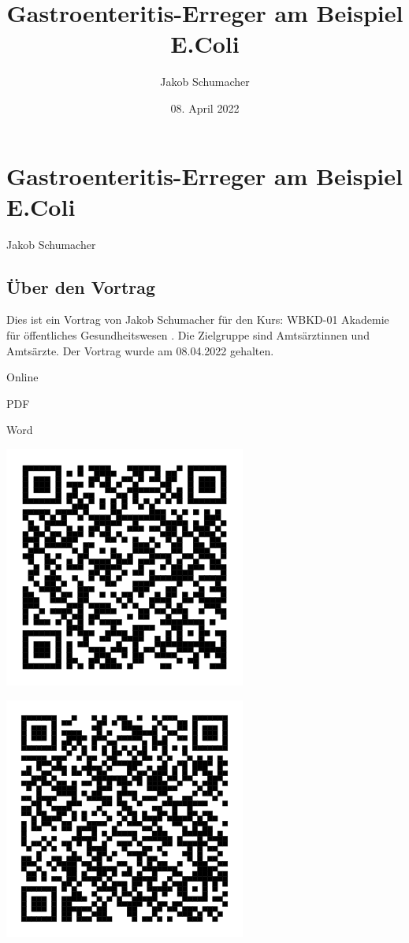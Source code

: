 \documentclass[
]{article}
\title{Gastroenteritis-Erreger am Beispiel E.Coli}
\author{Jakob Schumacher}
\date{08. April 2022}
\begin{document}
\maketitle

\hypertarget{gastroenteritis-erreger-am-beispiel-e.coli}{%
\section{Gastroenteritis-Erreger am Beispiel
E.Coli}\label{gastroenteritis-erreger-am-beispiel-e.coli}}

Jakob Schumacher

\hypertarget{uxfcber-den-vortrag}{%
\subsection{Über den Vortrag}\label{uxfcber-den-vortrag}}

Dies ist ein Vortrag von Jakob Schumacher für den Kurs: WBKD-01 Akademie
für öffentliches Gesundheitswesen . Die Zielgruppe sind Amtsärztinnen
und Amtsärzte. Der Vortrag wurde am 08.04.2022 gehalten.

Online

PDF

Word

\includegraphics{../assets/2022-04-08-WBKD-Gastroenteritis/QR-link.svg}

\includegraphics{../assets/2022-04-08-WBKD-Gastroenteritis/QR-pdf.svg}
\end{document}

